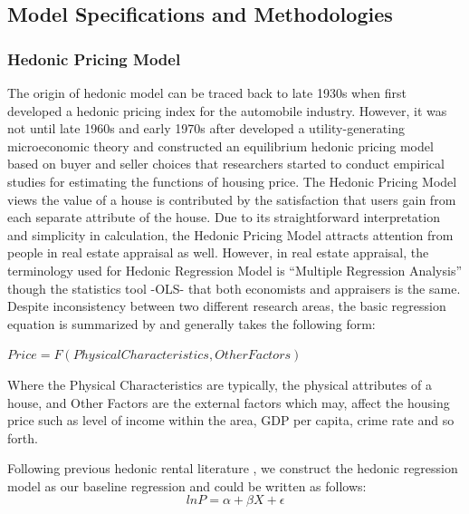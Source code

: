 \documentclass[a4paper, 12pt]{article} %
\begin{document}
\subsection{Model Specifications and Methodologies}
\subsubsection{Hedonic Pricing Model}
The origin of hedonic model can be traced back to late 1930s when \citet{court1939} first developed a hedonic pricing index for the automobile industry. However, it was not until late 1960s and early 1970s after \citet{lancaster1966new} developed a utility-generating microeconomic theory and \citet{rosen1974hedonic} constructed an equilibrium hedonic pricing model based on buyer and seller choices that researchers started to conduct empirical studies for estimating the functions of housing price. The Hedonic Pricing Model views the value of a house is contributed by the satisfaction that users gain from each separate attribute of the house. Due to its straightforward interpretation and simplicity in calculation, the Hedonic Pricing Model attracts attention from people in real estate appraisal as well. However, in real estate appraisal, the terminology used for Hedonic Regression Model is “Multiple Regression Analysis” though the statistics tool -OLS- that both economists and appraisers is the same. Despite inconsistency between two different research areas, the basic regression equation is summarized by \citet{sirmans2005composition} and generally takes the following form:

\bigskip
\centerline{ $Price=F(Physical Characteristics, Other Factors)$ }
\bigskip

\noindent Where the Physical Characteristics are typically, the physical attributes of a house, and Other Factors are the external factors which may, affect the housing price such as level of income within the area, GDP per capita, crime rate and so forth. 

Following previous hedonic rental literature \citep{djurdjevic2008estimation, lochl2010modelling, seya2011empirical}, we construct the hedonic regression model as our baseline regression and could be written as follows:
\begin{equation}
\label{eq1}
ln P = \alpha + \beta X + \epsilon
\end{equation}
\end{document}
